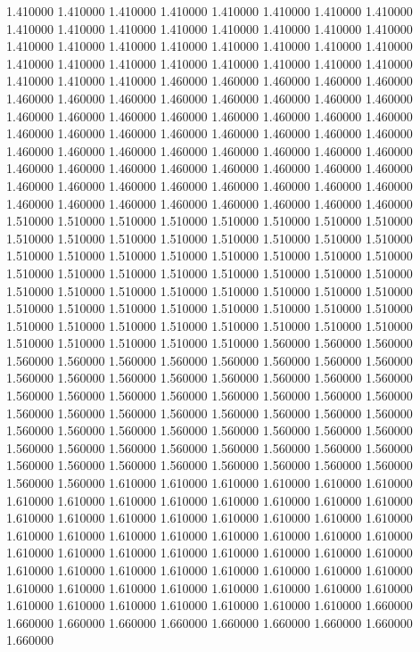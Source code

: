 1.410000
1.410000
1.410000
1.410000
1.410000
1.410000
1.410000
1.410000
1.410000
1.410000
1.410000
1.410000
1.410000
1.410000
1.410000
1.410000
1.410000
1.410000
1.410000
1.410000
1.410000
1.410000
1.410000
1.410000
1.410000
1.410000
1.410000
1.410000
1.410000
1.410000
1.410000
1.410000
1.410000
1.410000
1.410000
1.460000
1.460000
1.460000
1.460000
1.460000
1.460000
1.460000
1.460000
1.460000
1.460000
1.460000
1.460000
1.460000
1.460000
1.460000
1.460000
1.460000
1.460000
1.460000
1.460000
1.460000
1.460000
1.460000
1.460000
1.460000
1.460000
1.460000
1.460000
1.460000
1.460000
1.460000
1.460000
1.460000
1.460000
1.460000
1.460000
1.460000
1.460000
1.460000
1.460000
1.460000
1.460000
1.460000
1.460000
1.460000
1.460000
1.460000
1.460000
1.460000
1.460000
1.460000
1.460000
1.460000
1.460000
1.460000
1.460000
1.460000
1.460000
1.460000
1.460000
1.460000
1.510000
1.510000
1.510000
1.510000
1.510000
1.510000
1.510000
1.510000
1.510000
1.510000
1.510000
1.510000
1.510000
1.510000
1.510000
1.510000
1.510000
1.510000
1.510000
1.510000
1.510000
1.510000
1.510000
1.510000
1.510000
1.510000
1.510000
1.510000
1.510000
1.510000
1.510000
1.510000
1.510000
1.510000
1.510000
1.510000
1.510000
1.510000
1.510000
1.510000
1.510000
1.510000
1.510000
1.510000
1.510000
1.510000
1.510000
1.510000
1.510000
1.510000
1.510000
1.510000
1.510000
1.510000
1.510000
1.510000
1.510000
1.510000
1.510000
1.510000
1.510000
1.560000
1.560000
1.560000
1.560000
1.560000
1.560000
1.560000
1.560000
1.560000
1.560000
1.560000
1.560000
1.560000
1.560000
1.560000
1.560000
1.560000
1.560000
1.560000
1.560000
1.560000
1.560000
1.560000
1.560000
1.560000
1.560000
1.560000
1.560000
1.560000
1.560000
1.560000
1.560000
1.560000
1.560000
1.560000
1.560000
1.560000
1.560000
1.560000
1.560000
1.560000
1.560000
1.560000
1.560000
1.560000
1.560000
1.560000
1.560000
1.560000
1.560000
1.560000
1.560000
1.560000
1.560000
1.560000
1.560000
1.560000
1.560000
1.560000
1.560000
1.560000
1.610000
1.610000
1.610000
1.610000
1.610000
1.610000
1.610000
1.610000
1.610000
1.610000
1.610000
1.610000
1.610000
1.610000
1.610000
1.610000
1.610000
1.610000
1.610000
1.610000
1.610000
1.610000
1.610000
1.610000
1.610000
1.610000
1.610000
1.610000
1.610000
1.610000
1.610000
1.610000
1.610000
1.610000
1.610000
1.610000
1.610000
1.610000
1.610000
1.610000
1.610000
1.610000
1.610000
1.610000
1.610000
1.610000
1.610000
1.610000
1.610000
1.610000
1.610000
1.610000
1.610000
1.610000
1.610000
1.610000
1.610000
1.610000
1.610000
1.610000
1.610000
1.660000
1.660000
1.660000
1.660000
1.660000
1.660000
1.660000
1.660000
1.660000
1.660000
